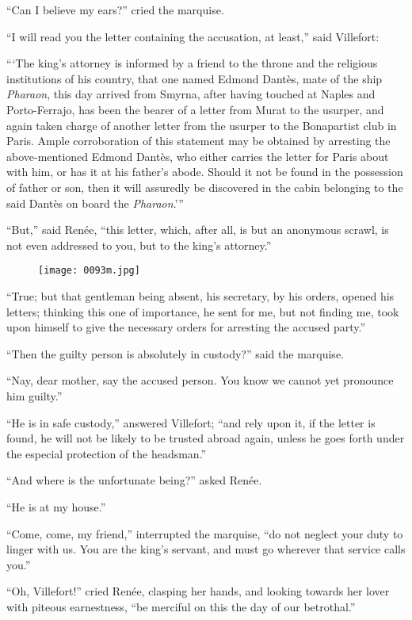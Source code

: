 “Can I believe my ears?” cried the marquise.

“I will read you the letter containing the accusation, at least,” said
Villefort:

“‘The king’s attorney is informed by a friend to the throne and the
religious institutions of his country, that one named Edmond Dantès,
mate of the ship \textit{Pharaon}, this day arrived from Smyrna, after having
touched at Naples and Porto-Ferrajo, has been the bearer of a letter
from Murat to the usurper, and again taken charge of another letter
from the usurper to the Bonapartist club in Paris. Ample corroboration
of this statement may be obtained by arresting the above-mentioned
Edmond Dantès, who either carries the letter for Paris about with him,
or has it at his father’s abode. Should it not be found in the
possession of father or son, then it will assuredly be discovered in
the cabin belonging to the said Dantès on board the \textit{Pharaon}.’”

“But,” said Renée, “this letter, which, after all, is but an anonymous
scrawl, is not even addressed to you, but to the king’s attorney.”

\begin{figure}[ht]
\texttt{[image: 0093m.jpg]}
\end{figure}

“True; but that gentleman being absent, his secretary, by his orders,
opened his letters; thinking this one of importance, he sent for me,
but not finding me, took upon himself to give the necessary orders for
arresting the accused party.”

“Then the guilty person is absolutely in custody?” said the marquise.

“Nay, dear mother, say the accused person. You know we cannot yet
pronounce him guilty.”

“He is in safe custody,” answered Villefort; “and rely upon it, if the
letter is found, he will not be likely to be trusted abroad again,
unless he goes forth under the especial protection of the headsman.”

“And where is the unfortunate being?” asked Renée.

“He is at my house.”

“Come, come, my friend,” interrupted the marquise, “do not neglect your
duty to linger with us. You are the king’s servant, and must go
wherever that service calls you.”

“Oh, Villefort!” cried Renée, clasping her hands, and looking towards
her lover with piteous earnestness, “be merciful on this the day of our
betrothal.”

